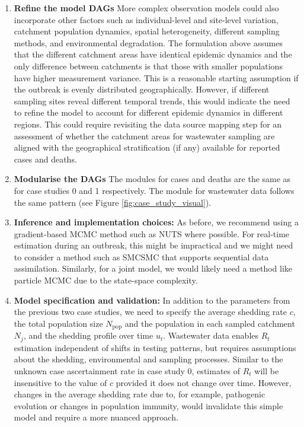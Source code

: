 \documentclass{article}
\begin{document}
\begin{enumerate}
\begin{enumerate}
       
\item \textbf{Refine the model DAGs} More complex observation models could also incorporate other factors such as individual-level and site-level variation, catchment population dynamics, spatial heterogeneity, different sampling methods, and environmental degradation. The formulation above assumes that the different catchment areas have identical epidemic dynamics and the only difference between catchments is that those with smaller populations have higher measurement variance. This is a reasonable starting assumption if the outbreak is evenly distributed geographically. However, if different sampling sites reveal different temporal trends, this would indicate the need to refine the model to account for different epidemic dynamics in different regions. This could require revisiting the data source mapping step for an assessment of whether the catchment areas for wastewater sampling are aligned with the geographical stratification (if any) available for reported cases and deaths.

\item \textbf{Modularise the DAGs} The modules for cases and deaths are the same as for case studies 0 and 1 respectively. The module for wastewater data follows the same pattern (see Figure \ref{fig:case_study_visual}).
    
    \item \textbf{Inference and implementation choices:} As before, we recommend using a gradient-based MCMC method such as NUTS where possible. For real-time estimation during an outbreak, this might be impractical and we might need to consider a method such as SMCSMC that supports sequential data assimilation. Similarly, for a joint model, we would likely need a method like particle MCMC due to the state-space complexity.

    \item \textbf{Model specification and validation:} In addition to the parameters from the previous two case studies, we need to specify the average shedding rate $c$, the total population size $N_\mathrm{pop}$ and the population in each sampled catchment $N_j$, and the shedding profile over time $u_t$. Wastewater data enables $R_t$ estimation independent of shifts in testing patterns, but requires assumptions about the shedding, environmental and sampling processes. Similar to the unknown case ascertainment rate in case study 0, estimates of $R_t$ will be insensitive to the value of $c$ provided it does not change over time. However, changes in the average shedding rate due to, for example, pathogenic evolution or changes in population immunity, would invalidate this simple model and require a more nuanced approach. 
    

\end{enumerate}
\end{enumerate}
\end{document}

